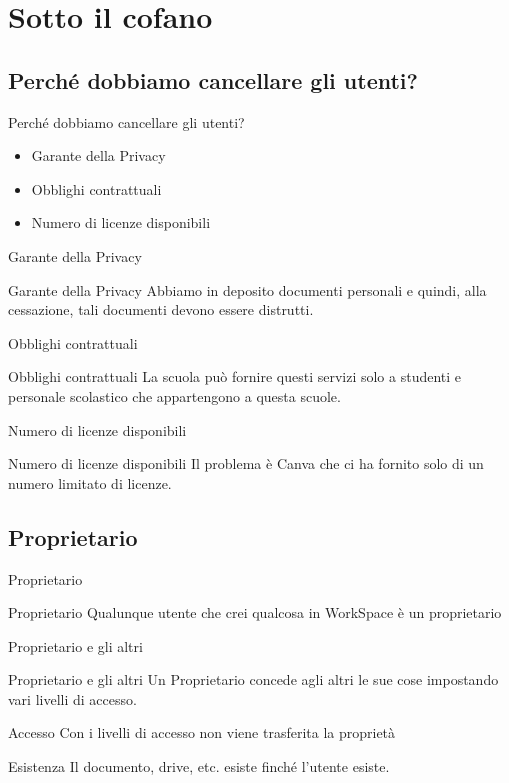 \section{Sotto il cofano}
\subsection{Perché dobbiamo cancellare gli utenti?}
\begin{frame}{Perché dobbiamo cancellare gli utenti?}
	\begin{itemize}
		\item<1-> Garante della Privacy
		\item<2-> Obblighi contrattuali
		\item<3-> Numero di licenze disponibili
	\end{itemize}
\end{frame}
\begin{frame}{Garante della Privacy}
	\begin{exampleblock}{Garante della Privacy}
		Abbiamo in deposito documenti personali e quindi, alla cessazione, tali documenti devono essere distrutti.
	\end{exampleblock}
\end{frame}
\begin{frame}{Obblighi contrattuali}
	\begin{block}{Obblighi contrattuali}
		La scuola può fornire questi servizi solo a studenti e personale scolastico che appartengono a questa scuole.
	\end{block}
\end{frame}
\begin{frame}{Numero di licenze disponibili}
	\begin{alertblock}{Numero di licenze disponibili}
		Il problema è Canva che ci ha fornito solo di un numero limitato di licenze.
	\end{alertblock}
\end{frame}
\subsection{Proprietario}
\begin{frame}[standout]{Proprietario}
	\begin{block}{Proprietario}
		Qualunque utente che crei qualcosa in WorkSpace è un proprietario
	\end{block}
\end{frame}
\begin{frame}{Proprietario e gli altri}
	\begin{block}{Proprietario e gli altri}
		Un Proprietario concede agli altri le sue cose impostando vari livelli di accesso.
	\end{block}
	\begin{alertblock}{Accesso}
		Con i livelli di accesso non viene trasferita la proprietà  
	\end{alertblock}
	\begin{exampleblock}{Esistenza}
		Il documento, drive, etc. esiste finché  l'utente esiste.
	\end{exampleblock}
\end{frame}
